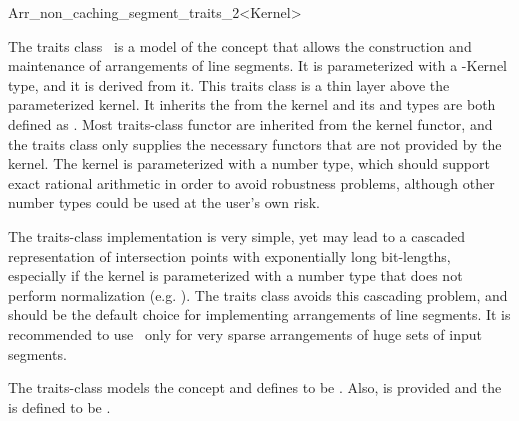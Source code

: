 
\ccRefPageBegin

\begin{ccRefClass}{Arr_non_caching_segment_traits_2<Kernel>}
    
\ccDefinition 

The traits class \ccRefName\ is a model of the 
concept that allows the construction and maintenance of arrangements of
line segments. It is parameterized with a \cgal-Kernel type, and it
is derived from it. This traits class is a thin layer above the
parameterized kernel. It inherits the  from the kernel and its
 and  types are both defined as
. Most traits-class functor are inherited from the
kernel functor, and the traits class only supplies the necessary functors
that are not provided by the kernel. The kernel is parameterized with a
number type, which should support exact rational arithmetic in order to
avoid robustness problems, although other number types could be used at the
user's own risk.

The traits-class implementation is very simple, yet may lead to
a cascaded representation of intersection points with exponentially long
bit-lengths, especially if the kernel is parameterized with a number type
that does not perform normalization (e.g. ).
The  traits class avoids this cascading
problem, and should be the default choice for implementing arrangements of
line segments. It is recommended to use \ccRefName\ only for very sparse
arrangements of huge sets of input segments.

The traits-class models the  concept
and defines  to
be .
Also,
 is provided and the 
is defined to be .
    
 
\ccIsModel
     \\
     \\

\ccInheritsFrom

\ccSeeAlso

\end{ccRefClass}
\ccRefPageEnd
